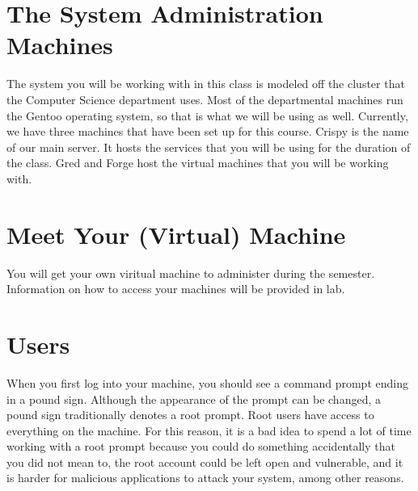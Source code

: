\documentclass{article}
\begin{document}



\section*{The System Administration Machines}

The system you will be working with in this class is modeled off the cluster
that the Computer Science department uses. Most of the departmental machines run
the Gentoo operating system, so that is what we will be using as well.
Currently, we have three machines that have been set up for this course. Crispy
is the name of our main server. It hosts the services that you will be using for the duration
of the class. Gred and Forge host the virtual machines that you will be working
with.

\section*{Meet Your (Virtual) Machine} 
You will get your own viritual machine to administer during the semester.
Information on how to access your machines will be provided in lab.

\section*{Users}

When you first log into your machine, you should see a command prompt ending in
a pound sign. Although the appearance of the prompt can be changed, a pound sign
traditionally denotes a root prompt. Root users have access to everything on the
machine. For this reason, it is a bad idea to spend a lot of time working with a
root prompt because you could do something accidentally that you did not mean
to, the root account could be left open and vulnerable, and it is harder for
malicious applications to attack your system, among other reasons.
\end{document}
